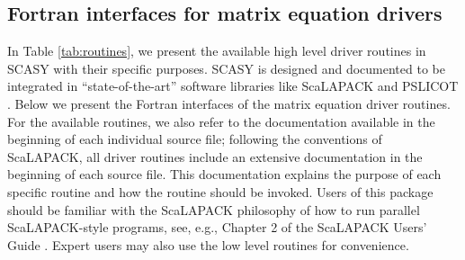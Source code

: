 \documentclass[11pt]{article}
\begin{document}

\subsection{Fortran interfaces for matrix equation drivers}
\label{sec:interfaces} In Table \ref{tab:routines}, we present the
available high level driver routines in SCASY with their specific
purposes. SCASY is designed and documented to be integrated in
``state-of-the-art'' software libraries like ScaLAPACK
\cite{blackfordetal97} and PSLICOT
\cite{slicot,blanquer98parallelslicot}. Below we present the
Fortran interfaces of the matrix equation driver routines. For the
available routines, we also refer to the documentation available
in the beginning of each individual source file; following the
conventions of ScaLAPACK, all driver routines include an extensive
documentation in the beginning of each source file. This
documentation explains the purpose of each specific routine and
how the routine should be invoked. Users of this package should be
familiar with the ScaLAPACK philosophy of how to run parallel
ScaLAPACK-style programs, see, e.g., Chapter 2 of the ScaLAPACK
Users' Guide \cite{blackfordetal97}. Expert users may also use the
low level routines for convenience.
\end{document}
